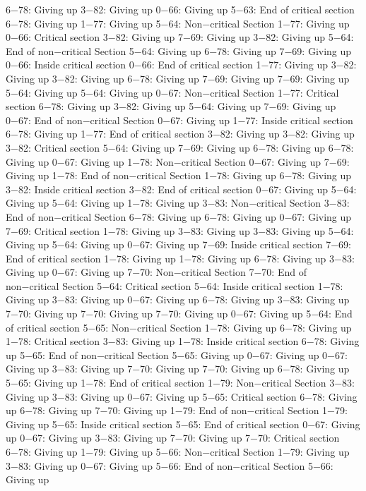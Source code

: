 6−78: Giving up
3−82: Giving up
0−66: Giving up
5−63: End of critical section
6−78: Giving up
1−77: Giving up
5−64: Non−critical Section
1−77: Giving up
0−66: Critical section
3−82: Giving up
7−69: Giving up
3−82: Giving up
5−64: End of non−critical Section
5−64: Giving up
6−78: Giving up
7−69: Giving up
0−66: Inside critical section
0−66: End of critical section
1−77: Giving up
3−82: Giving up
3−82: Giving up
6−78: Giving up
7−69: Giving up
7−69: Giving up
5−64: Giving up
5−64: Giving up
0−67: Non−critical Section
1−77: Critical section
6−78: Giving up
3−82: Giving up
5−64: Giving up
7−69: Giving up
0−67: End of non−critical Section
0−67: Giving up
1−77: Inside critical section
6−78: Giving up
1−77: End of critical section
3−82: Giving up
3−82: Giving up
3−82: Critical section
5−64: Giving up
7−69: Giving up
6−78: Giving up
6−78: Giving up
0−67: Giving up
1−78: Non−critical Section
0−67: Giving up
7−69: Giving up
1−78: End of non−critical Section
1−78: Giving up
6−78: Giving up
3−82: Inside critical section
3−82: End of critical section
0−67: Giving up
5−64: Giving up
5−64: Giving up
1−78: Giving up
3−83: Non−critical Section
3−83: End of non−critical Section
6−78: Giving up
6−78: Giving up
0−67: Giving up
7−69: Critical section
1−78: Giving up
3−83: Giving up
3−83: Giving up
5−64: Giving up
5−64: Giving up
0−67: Giving up
7−69: Inside critical section
7−69: End of critical section
1−78: Giving up
1−78: Giving up
6−78: Giving up
3−83: Giving up
0−67: Giving up
7−70: Non−critical Section
7−70: End of non−critical Section
5−64: Critical section
5−64: Inside critical section
1−78: Giving up
3−83: Giving up
0−67: Giving up
6−78: Giving up
3−83: Giving up
7−70: Giving up
7−70: Giving up
7−70: Giving up
0−67: Giving up
5−64: End of critical section
5−65: Non−critical Section
1−78: Giving up
6−78: Giving up
1−78: Critical section
3−83: Giving up
1−78: Inside critical section
6−78: Giving up
5−65: End of non−critical Section
5−65: Giving up
0−67: Giving up
0−67: Giving up
3−83: Giving up
7−70: Giving up
7−70: Giving up
6−78: Giving up
5−65: Giving up
1−78: End of critical section
1−79: Non−critical Section
3−83: Giving up
3−83: Giving up
0−67: Giving up
5−65: Critical section
6−78: Giving up
6−78: Giving up
7−70: Giving up
1−79: End of non−critical Section
1−79: Giving up
5−65: Inside critical section
5−65: End of critical section
0−67: Giving up
0−67: Giving up
3−83: Giving up
7−70: Giving up
7−70: Critical section
6−78: Giving up
1−79: Giving up
5−66: Non−critical Section
1−79: Giving up
3−83: Giving up
0−67: Giving up
5−66: End of non−critical Section
5−66: Giving up
